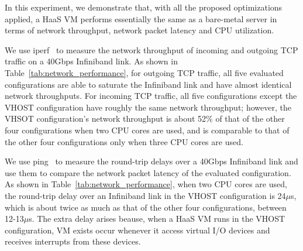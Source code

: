 In this experiment, we demonstrate that, with all  the proposed optimizations applied,  a HaaS VM performs essentially the same as a bare-metal server in terms of network throughput, network packet latency and CPU utilization.



We use  iperf~\cite{iperf} to measure the network throughput of
incoming and outgoing TCP traffic on a 40Gbps Infiniband link.
As shown in Table~\ref{tab:network_performance}, for outgoing TCP traffic, 
all five evaluated configurations are able to saturate the Infiniband link and 
have almost identical network throughputs. 
For incoming TCP  traffic, all five configurations except the VHOST configuration have roughly the same network throughput; however, the VHSOT configuration's network throughput 
is about 52\% of that of the other four configurations when two CPU cores are used, and is comparable to that of the other four configurations only when three CPU cores are used. 



We use ping~\cite{ping} to measure the round-trip delays over a 40Gbps Infiniband link and use them to compare the network packet latency of the evaluated configuration. 
As shown in Table~\ref{tab:network_performance}, when two CPU cores are used, the round-trip delay over an Infiniband link in the 
VHOST configuration is 24$\mu$s, which is about twice as much as that of the other four configurations, between 12-13$\mu$s.
The extra delay arises beause, when a HaaS VM runs in the VHOST configuration, VM exists occur whenever it access virtual I/O devices and receives interrupts from these devices.





